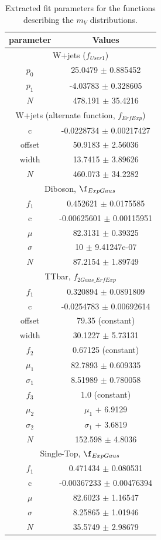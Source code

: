 \begin{table}[h!]
	\centering
	\begin{tabular}{||c | c||} 
	 \hline
	  parameter & Values \\
	 \hline \hline
	 \multicolumn{2}{|c|}{W+jets ($f_{User1}$)}\\
	 \hline
	 $p_0$		&	25.0479 $\pm$ 0.885452\\
	 $p_1$		&	-4.03783 $\pm$ 0.328605\\
	 $N$		&	478.191 $\pm$ 35.4216\\
	 \hline \hline
	 \multicolumn{2}{|c|}{W+jets (alternate function, $f_{ErfExp}$)}\\
	 \hline
	 c 			&	-0.0228734 $\pm$ 0.00217427\\
	 offset 	&	50.9183 $\pm$ 2.56036\\
	 width 		&	13.7415 $\pm$ 3.89626\\
	 $N$		&	460.073 $\pm$ 34.2282\\
	 \hline \hline
	 \multicolumn{2}{|c|}{Diboson, $\f_{ExpGaus}$}\\
	 \hline 
	 $f_1$		&	0.452621 $\pm$ 0.0175585\\
	 c 			&	-0.00625601 $\pm$ 0.00115951 \\
	 $\mu$		&	82.3131 $\pm$ 0.39325\\
	 $\sigma$	&	10 $\pm$ 9.41247e-07\\
	 $N$		&	87.2154 $\pm$ 1.89749\\
	 \hline \hline
	 \multicolumn{2}{|c|}{TTbar, $f_{2Gaus\_ErfExp}$}\\
	 \hline 
	 $f_1$		&	0.320894 $\pm$ 0.0891809\\
	 c 			&	-0.0254783 $\pm$ 0.00692614\\
	 offset 	&	79.35 (constant)\\
	 width 		&	30.1227 $\pm$ 5.73131\\
	 $f_2$		&	0.67125 (constant)\\
	 $\mu_1$	&	82.7893 $\pm$ 0.609335\\
	 $\sigma_1$	&	8.51989 $\pm$ 0.780058\\
	 $f_3$		&	1.0 (constant)\\
	 $\mu_2$	&	$\mu_1$ + 6.9129 \\
	 $\sigma_2$	&	$\sigma_1$ + 3.6819\\
	 $N$		&	152.598 $\pm$ 4.8036\\
	 \hline \hline
	 \multicolumn{2}{|c|}{Single-Top, $\f_{ExpGaus}$}\\
	 \hline 
	 $f_1$		&	0.471434 $\pm$ 0.080531\\
	 c 			&	-0.00367233 $\pm$ 0.00476394 \\
	 $\mu$		&	82.6023 $\pm$ 1.16547\\
	 $\sigma$	&	8.25865 $\pm$ 1.01946\\
	 $N$		&	35.5749 $\pm$ 2.98679\\
	 \hline 
	\end{tabular}
 	\caption{Extracted fit parameters for the functions describing the $m_{V}$ distributions.}
 	\label{Table:BackgroundEst_fitPars}
\end{table}


